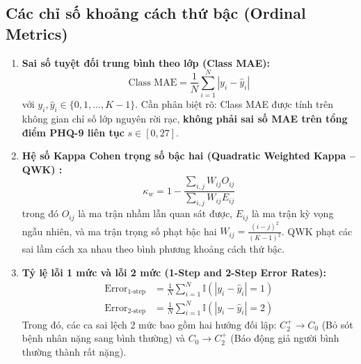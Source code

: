 \subsection{Các chỉ số khoảng cách thứ bậc (Ordinal Metrics)}
\begin{enumerate}
    \item \textbf{Sai số tuyệt đối trung bình theo lớp (Class MAE):}
    \begin{equation}
        \text{Class MAE} = \frac{1}{N} \sum_{i=1}^N |y_i - \hat{y}_i|
    \end{equation}
    với $y_i, \hat{y}_i \in \{0, 1, \dots, K-1\}$. Cần phân biệt rõ: Class MAE được tính trên không gian chỉ số lớp nguyên rời rạc, \textbf{không phải sai số MAE trên tổng điểm PHQ-9 liên tục} $s \in [0, 27]$.
    \item \textbf{Hệ số Kappa Cohen trọng số bậc hai (Quadratic Weighted Kappa -- QWK) \cite{cohen1968weighted}:}
    \begin{equation}
        \kappa_w = 1 - \frac{\sum_{i,j} W_{ij} O_{ij}}{\sum_{i,j} W_{ij} E_{ij}}
    \end{equation}
    trong đó $O_{ij}$ là ma trận nhầm lẫn quan sát được, $E_{ij}$ là ma trận kỳ vọng ngẫu nhiên, và ma trận trọng số phạt bậc hai $W_{ij} = \frac{(i - j)^2}{(K - 1)^2}$. QWK phạt các sai lầm cách xa nhau theo bình phương khoảng cách thứ bậc.
    \item \textbf{Tỷ lệ lỗi 1 mức và lỗi 2 mức (1-Step and 2-Step Error Rates):}
    \begin{align}
        \text{Error}_{\text{1-step}} &= \frac{1}{N} \sum_{i=1}^N \mathbb{I}(|y_i - \hat{y}_i| = 1) \\
        \text{Error}_{\text{2-step}} &= \frac{1}{N} \sum_{i=1}^N \mathbb{I}(|y_i - \hat{y}_i| = 2)
    \end{align}
    Trong đó, các ca sai lệch 2 mức bao gồm hai hướng đối lập: $C_2^+ \to C_0$ (Bỏ sót bệnh nhân nặng sang bình thường) và $C_0 \to C_2^+$ (Báo động giả người bình thường thành rất nặng).
\end{enumerate}
\cleardoublepage

